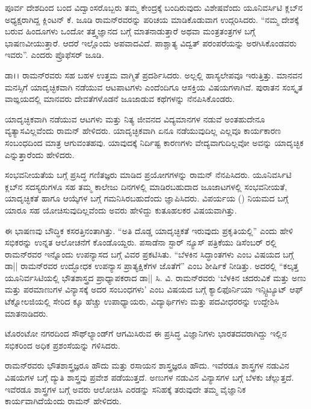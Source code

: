 ಪೂರ್ವ ದೇಶದಿಂದ ಬಂದ ವಿದ್ವಾಂಸರೊಬ್ಬರು ತಮ್ಮ ಕೇಂದ್ರಕ್ಕೆ ಬಂದಿರುವುದು ವಿಶೇಷವೆಂದು ಯೂನಿವರ್ಸಿಟಿ ಕ್ಲಬ್‍ನ ಅಧ್ಯಕ್ಷರಾಗಿದ್ದ ಕ್ಲಿಂಟನ್ ಕೆ. ಜೂಡಿ ರಾಮನ್‍ರವರನ್ನು ಪರಿಚಯ ಮಾಡಿಕೊಡುವಾಗ ಉದ್ಗರಿಸಿದರು. “ನಮ್ಮ ದೇಶಕ್ಕೆ ಬರುವ ಹಿಂದೂಗಳು ಒಂದೋ ತತ್ತ್ವಜ್ಞಾನದ ಬಗ್ಗೆ ಮಾತನಾಡುತ್ತಾರೆ ಅಥವಾ ಮಂತ್ರ\enginline{-}ತಂತ್ರಗಳ ಬಗ್ಗೆ ಭಾಷಣವೀಯುತ್ತಾರೆ. ಆದರೆ ಇಲ್ಲೊಂದು ಅಪವಾದವಿದೆ. ಪಾಶ್ಚಾತ್ಯ ವಿದ್ವತ್ ಪರಂಪರೆಯನ್ನು ಅರಗಿಸಿಕೊಂಡವರು ಇವರು”. ಎಂದರು ಪ್ರೊಫೆಸರ್ ಜೂಡಿ.

ಡಾ।। ರಾಮನ್‍ರವರು ಸಹ ಬಹಳ ಉತ್ತಮ ವಾಗ್ಮಿತೆ ಪ್ರದರ್ಶಿಸಿದರು. ಅಲ್ಲಲ್ಲಿ ಹಾಸ್ಯಲೇಪವೂ ಇರುತ್ತಿತ್ತು. ಮಾನವನ ಮನಸ್ಸಿಗೆ ಯಾದೃಚ್ಛಿಕವಾಗಿ ನಡೆಯುವ ಆಟ\enginline{-}ಪಾಟಗಳು ಎಂದೆಂದಿಗೂ ಆಸಕ್ತಿಯ ವಿಷಯಗಳಾಗಿವೆ. ಪುರಾತನ ಸಂಸ್ಕೃತ ವಾಙ್ಞಯದಲ್ಲಿ ಮಾನವರು ದೇವತೆಗಳೊಡನೆ ಜೂಜಾಡುವ ಕಥೆಗಳನ್ನು ನೆನಪಿಸಿಕೊಂಡರು.

ಯಾದೃಚ್ಛಿಕವಾಗಿ ನಡೆಯುವ ಆಟಗಳು ಮತ್ತು ನಿತ್ಯ ಜೀವನದ ವಿದ್ಯಮಾನಗಳ ನಡುವೆ ಅಂತಹುದೇನೂ ವ್ಯತ್ಯಾಸವಿಲ್ಲವೆಂದು ರಾಮನ್ ಹೇಳಿದರು. ಯಾದೃಚ್ಛಿಕವಾಗಿ ಏನೂ ನಡೆಯುವುದಿಲ್ಲ ಎಲ್ಲವೂ ಕಾರ್ಯಕಾರಣ ಸಂಬಂಧದಿಂದ ಮಾತ್ರ ಆಗುವಂತಹವು. ಯಾವುದಕ್ಕೆ ನಿರ್ದಿಷ್ಟ ಕಾರಣಗಳು ವೇದ್ಯವಾಗುದಿಲ್ಲವೋ ಅವನ್ನು ಯಾದೃಚ್ಛಿಕ ಎನ್ನುತ್ತಾರೆಂದು ಹೇಳಿದರು.

ಸಂಭವನೀಯತೆಯ ಬಗ್ಗೆ ಪ್ರಸಿದ್ಧ ಗಣಿತಜ್ಞರು ಮಾಡಿದ ಪ್ರಯೋಗಗಳನ್ನು ರಾಮನ್ ನೆನಪಿಸಿದರು. ಯೂನಿವರ್ಸಿಟಿ ಕ್ಲಬ್‍ನ ಸದಸ್ಯರುಗಳೂ ಸಹ ತಮ್ಮ ಕಾಲೇಜು ದಿನಗಳಲ್ಲಿ ಮಾಡಿರಬಹುದಾದ ಜೂಜಾಟಗಳಲ್ಲಿ ಸಂಭವನೀಯತೆ, ಯಾದೃಚ್ಛಿಕತೆ ಹಾಗೂ ಆಯ್ಕೆಗಳ ಬಗ್ಗೆ ಗಮನಿಸಿರಬಹುದೆಂದು ಜ್ಞಾಪಿಸಿದರು. ವಿಪರ್ಯಯ () ನಿಯಮದ ಬಗ್ಗೆ ಯಾರೂ ಸಹ ಯೋಚಿಸುವುದಿಲ್ಲವೆಂದು ಅವರು ಹೇಳಿದ್ದು ಕುತೂಹಲಕರ ವಿಷಯವಾಗಿತ್ತು.

ಈ ಭಾಷಣವು ಬೌದ್ಧಿಕ ಕಸರತ್ತಿನಂತಾಗಿತ್ತು. “ಅತಿ ದೊಡ್ಡ ಯಾದೃಚ್ಛಿಕತೆ ಇರುವುದು ಪ್ರಕೃತಿಯಲ್ಲಿ” ಎಂದು ಹೇಳಿ ಸಭಿಕರನ್ನು ಉನ್ನತ ಆಲೋಚನೆಗೆ ಕೊಂಡೊಯ್ದರು. ಪಸಾಡೆನಾ ಸ್ಟಾರ್ ನ್ಯೂಸ್ ಪತ್ರಿಕೆಯು  ಡಿಸೆಂಬರ್ ರಲ್ಲಿ ರಾಮನ್‍ರವರ ಇನ್ನೊಂದು ಉಪನ್ಯಾಸದ ಬಗ್ಗೆ ವಿವರ ಪ್ರಕಟಿಸಿತು. “ಬೆಳಕಿನ ಸಿದ್ಧಾಂತಗಳು ಎಂಬ ವಿಷಯದ ಬಗ್ಗೆ ಡಾ|| ರಾಮನ್‍ರವರ ಉದ್ಭೋಧಕ ಉಪನ್ಯಾಸ ಪ್ರಾತ್ಯಕ್ಷಿಕೆಗಳ ಜೊತೆಗೆ” ಎಂಬ ಶೀರ್ಷಿಕೆ ನೀಡಿತ್ತು. ಅದರಲ್ಲಿ \enginline{-} “ಕಲ್ಕತ್ತ ಯೂನಿರ್ವಸಿಟಿಯಲ್ಲಿ ಭೌತಶಾಸ್ತ್ರದ ಪ್ರಾಧ್ಯಾಪಕರಾದ ಡಾ|| ಸಿ. ವಿ. ರಾಮನ್‍ರವರು ‘ಬೆಳಕಿನ ಚದರುವಿಕೆ ಮತ್ತು ಅಣು ಮತ್ತು ಪರಮಾಣುಗಳ ವಿನ್ಯಾಸಕ್ಕೆ ಅದರ ಸಂಬಂಧಗಳು’ ಎಂಬ ವಿಷಯದ ಬಗ್ಗೆ ಕ್ಯಾಲಿಫೊರ್ನಿಯಾ ಇನ್ಸ್ಟಿಟ್ಯೂಟ್ ಆಫ್ ಟೆಕ್ನೋಲಜಿಯಲ್ಲಿ ಸೇರಿದ  ಕ್ಕೂ ಹೆಚ್ಚು ಉಪಾಧ್ಯಾಯರು, ವಿದ್ಯಾರ್ಥಿಗಳು ಮತ್ತು ಪದವೀಧರರನ್ನು ಉದ್ದೇಶಿಸಿ ಮಾತನಾಡಿದರು.

ಟೊರಂಟೋ ನಗರದಿಂದ ಸೌಥ್‍ಲ್ಯಾಂಡ್‍ಗೆ ಆಗಮಿಸಿರುವ ಈ ಪ್ರಸಿದ್ಧ ವಿಜ್ಞಾನಿಗಳು ಭಾರತದವರಾಗಿದ್ದು ಇಲ್ಲಿನ ಸಭಿಕರಿಂದ ಅಧಿಕ ಪ್ರಶಂಸೆಯನ್ನು ಗಳಿಸಿದರು.

ರಾಮನ್‍ರವರು ಭೌತಶಾಸ್ತ್ರಜ್ಞರೂ ಹೌದು ಮತ್ತು ರಸಾಯನ ಶಾಸ್ತ್ರಜ್ಞರೂ ಹೌದು. ಇವೆರಡೂ ಶಾಸ್ತ್ರಗಳ ನಡುವಿನ ವಿಷಯಗಳ ಬಗ್ಗೆ ದ್ಯುತಿ ಶಾಸ್ತ್ರವು ಪ್ರವೇಶ ಪಡೆಯುತ್ತದೆ. ಅಣುಗಳ ನಡುವಿನ ವಿನ್ಯಾಸಗಳ ಬಗ್ಗೆ ಬೆಳಕು ಚೆಲ್ಲುತ್ತದೆ. ಇವೆರಡೂ ಶಾಸ್ತ್ರಗಳ ಬಗ್ಗೆ ಅವರು ಆಲೋಚಿಸಿ ಎರಡನ್ನು ಸನಿಹಕ್ಕೆ ತರುವುದೇ ತಮ್ಮ ವೈಜ್ಞಾನಿಕ ಕಾರ್ಯವಾಗಿದೆಯೆಂದು ರಾಮನ್ ಹೇಳಿದರು.


